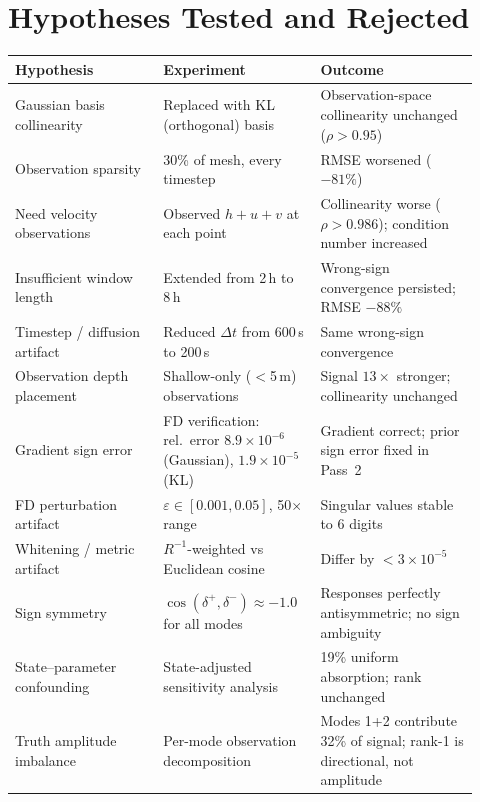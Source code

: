 \documentclass[11pt]{article}
\theoremstyle{definition}
\begin{document}
\section{Hypotheses Tested and Rejected}
\label{sec:ruled-out}

\begin{longtable}{p{0.30\linewidth}p{0.30\linewidth}p{0.32\linewidth}}
\toprule
Hypothesis & Experiment & Outcome \\
\midrule
Gaussian basis collinearity &
  Replaced with KL (orthogonal) basis &
  Observation-space collinearity unchanged ($\rho > 0.95$) \\
Observation sparsity &
  30\% of mesh, every timestep &
  RMSE worsened ($-81\%$) \\
Need velocity observations &
  Observed $h + u + v$ at each point &
  Collinearity worse ($\rho > 0.986$); condition number increased \\
Insufficient window length &
  Extended from 2\,h to 8\,h &
  Wrong-sign convergence persisted; RMSE $-88\%$ \\
Timestep / diffusion artifact &
  Reduced $\Delta t$ from 600\,s to 200\,s &
  Same wrong-sign convergence \\
Observation depth placement &
  Shallow-only ($<$5\,m) observations &
  Signal $13\times$ stronger; collinearity unchanged \\
Gradient sign error &
  FD verification: rel.\ error $8.9\times 10^{-6}$ (Gaussian),
  $1.9\times 10^{-5}$ (KL) &
  Gradient correct; prior sign error fixed in Pass~2 \\
FD perturbation artifact &
  $\varepsilon \in [0.001, 0.05]$, 50$\times$ range &
  Singular values stable to 6 digits \\
Whitening / metric artifact &
  $R^{-1}$-weighted vs Euclidean cosine &
  Differ by $< 3\times 10^{-5}$ \\
Sign symmetry &
  $\cos(\delta^+, \delta^-) \approx -1.0$ for all modes &
  Responses perfectly antisymmetric; no sign ambiguity \\
State--parameter confounding &
  State-adjusted sensitivity analysis &
  19\% uniform absorption; rank unchanged \\
Truth amplitude imbalance &
  Per-mode observation decomposition &
  Modes 1+2 contribute 32\% of signal; rank-1 is directional, not amplitude \\
\bottomrule
\end{longtable}
\end{document}

